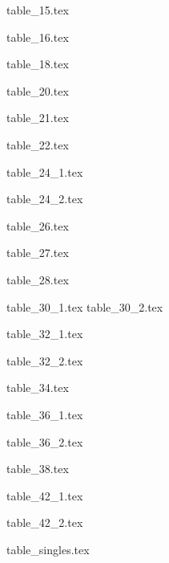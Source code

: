 \documentclass[a4paper]{amsart}
\makeatletter
\newcommand*\ExpandableInput[1]{\@@input#1 }
\theoremstyle{definition}
\theoremstyle{plain}
\makeatother
\begin{document}
\ExpandableInput{table_15.tex}

\ExpandableInput{table_16.tex}

%

\ExpandableInput{table_18.tex}

%

\ExpandableInput{table_20.tex}

\ExpandableInput{table_21.tex}

\ExpandableInput{table_22.tex}

%

\ExpandableInput{table_24_1.tex}

\ExpandableInput{table_24_2.tex}

%

\ExpandableInput{table_26.tex}

\ExpandableInput{table_27.tex}

\ExpandableInput{table_28.tex}

\ExpandableInput{table_30_1.tex}
\vspace{-1em}
\ExpandableInput{table_30_2.tex}

\ExpandableInput{table_32_1.tex}

\ExpandableInput{table_32_2.tex}

%

\ExpandableInput{table_34.tex}

\ExpandableInput{table_36_1.tex}

\ExpandableInput{table_36_2.tex}

\ExpandableInput{table_38.tex}

%

%

\ExpandableInput{table_42_1.tex}

\ExpandableInput{table_42_2.tex}

%

%

%
%
%
%
%

%

%

%

%

%

%

%

\ExpandableInput{table_singles.tex}


 
\end{document}
